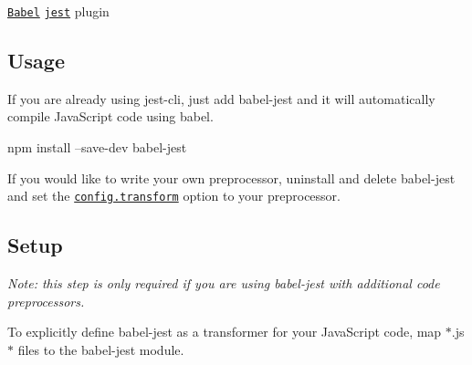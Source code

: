 \href{https://github.com/babel/babel}{\tt Babel} \href{https://github.com/facebook/jest}{\tt jest} plugin

\subsection*{Usage}

If you are already using {\ttfamily jest-\/cli}, just add {\ttfamily babel-\/jest} and it will automatically compile Java\+Script code using babel.


\begin{DoxyCode}
npm install --save-dev babel-jest
\end{DoxyCode}


If you would like to write your own preprocessor, uninstall and delete babel-\/jest and set the \href{http://facebook.github.io/jest/docs/configuration.html#transform-object-string-string}{\tt config.\+transform} option to your preprocessor.

\subsection*{Setup}

{\itshape Note\+: this step is only required if you are using {\ttfamily babel-\/jest} with additional code preprocessors.}

To explicitly define {\ttfamily babel-\/jest} as a transformer for your Java\+Script code, map $\ast$.js$\ast$ files to the {\ttfamily babel-\/jest} module.


 